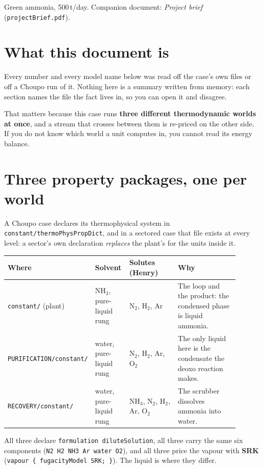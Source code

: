 \documentclass[11pt,a4paper]{article}
\begin{document}
          {Green ammonia, 500\,t/day. Companion document:
           \emph{Project brief} (\texttt{projectBrief.pdf}).}

\section*{What this document is}

Every number and every model name below was read off the case's own files or
off a Choupo run of it. Nothing here is a summary written from memory: each
section names the file the fact lives in, so you can open it and disagree.

That matters because this case runs \textbf{three different thermodynamic
worlds at once}, and a stream that crosses between them is re-priced on the
other side. If you do not know which world a unit computes in, you cannot read
its energy balance.

\section{Three property packages, one per world}

A Choupo case declares its thermophysical system in
\texttt{constant/thermoPhysPropDict}, and in a sectored case that file exists at
every level: a sector's own declaration \emph{replaces} the plant's for the
units inside it.

{\small\begin{longtable}{@{}L{0.20\linewidth}L{0.15\linewidth}L{0.24\linewidth}L{0.31\linewidth}@{}}
\toprule
\textbf{Where} & \textbf{Solvent} & \textbf{Solutes (Henry)} & \textbf{Why} \\
\midrule
\endhead
\texttt{constant/} (plant) & NH$_3$, pure-liquid rung &
  N$_2$, H$_2$, Ar &
  The loop and the product: the condensed phase is liquid ammonia. \\
\texttt{PURIFICATION/\allowbreak{}constant/} & water, pure-liquid rung &
  N$_2$, H$_2$, Ar, O$_2$ &
  The only liquid here is the condensate the deoxo reaction makes. \\
\texttt{RECOVERY/\allowbreak{}constant/} & water, pure-liquid rung &
  NH$_3$, N$_2$, H$_2$, Ar, O$_2$ &
  The scrubber dissolves ammonia into water. \\
\bottomrule
\end{longtable}}

All three declare \texttt{formulation diluteSolution}, all three carry the same
six components (\texttt{N2 H2 NH3 Ar water O2}), and all three price the vapour
with \textbf{SRK} (\texttt{vapour \{ fugacityModel SRK; \}}). The liquid is
where they differ.
\end{document}
